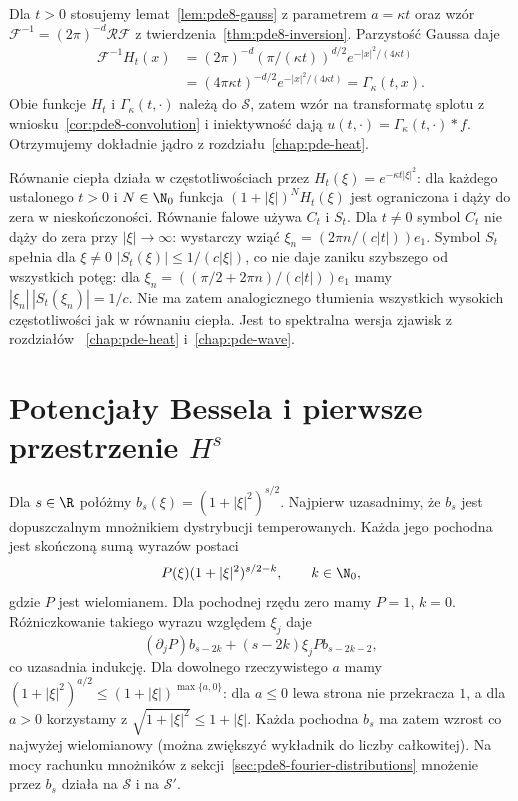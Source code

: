 \begin{uwaga}
Dla $t>0$ stosujemy lemat~\ref{lem:pde8-gauss}
z parametrem $a=\kappa t$ oraz wzór
$\mathcal F^{-1}=(2\pi)^{-d}\mathcal R\mathcal F$
z twierdzenia~\ref{thm:pde8-inversion}.
Parzystość Gaussa daje
\[
 \begin{aligned}
 \mathcal F^{-1}H_t(x)
 &=(2\pi)^{-d}(\pi/(\kappa t))^{d/2}
 e^{-|x|^2/(4\kappa t)}\\
 &=(4\pi\kappa t)^{-d/2}e^{-|x|^2/(4\kappa t)}
 =\Gamma_\kappa(t,x).
 \end{aligned}
\]
Obie funkcje $H_t$ i $\Gamma_\kappa(t,\cdot)$
należą do $\mathcal S$, zatem wzór na transformatę
splotu z wniosku~\ref{cor:pde8-convolution}
i iniektywność dają $u(t,\cdot)=
\Gamma_\kappa(t,\cdot)*f$. Otrzymujemy dokładnie
jądro z rozdziału~\ref{chap:pde-heat}.
\end{uwaga}

\begin{uwaga}
Równanie ciepła działa w częstotliwościach przez
$H_t(\xi)=e^{-\kappa t|\xi|^2}$: dla każdego
ustalonego $t>0$ i $N\in\N_0$ funkcja
$(1+|\xi|)^N H_t(\xi)$ jest ograniczona
i dąży do zera w nieskończoności.
Równanie falowe używa $C_t$ i $S_t$.
Dla $t\ne0$ symbol $C_t$ nie dąży do zera
przy $|\xi|\to\infty$: wystarczy wziąć
$\xi_n=(2\pi n/(c|t|))e_1$.
Symbol $S_t$ spełnia dla $\xi\ne0$
$|S_t(\xi)|\le1/(c|\xi|)$, co nie daje
zaniku szybszego od wszystkich potęg:
dla $\xi_n=((\pi/2+2\pi n)/(c|t|))e_1$
mamy $|\xi_n|\,|S_t(\xi_n)|=1/c$.
Nie ma zatem analogicznego tłumienia wszystkich
wysokich częstotliwości jak w równaniu ciepła.
Jest to spektralna wersja zjawisk z rozdziałów
~\ref{chap:pde-heat} i~\ref{chap:pde-wave}.
\end{uwaga}

\section[Potencjały Bessela i przestrzenie Sobolewa]{Potencjały Bessela i pierwsze przestrzenie $H^s$}
\label{sec:pde8-bessel}

Dla $s\in\R$ połóżmy $b_s(\xi)=(1+|\xi|^2)^{s/2}$.
Najpierw uzasadnimy, że $b_s$ jest dopuszczalnym
mnożnikiem dystrybucji temperowanych.
Każda jego pochodna jest skończoną sumą wyrazów
postaci
\[
 P(\xi)(1+|\xi|^2)^{s/2-k},
 \qquad k\in\N_0,
\]
gdzie $P$ jest wielomianem. Dla pochodnej rzędu
zero mamy $P=1$, $k=0$. Różniczkowanie takiego
wyrazu względem $\xi_j$ daje
\[
 (\partial_j P)b_{s-2k}
 +(s-2k)\xi_j P b_{s-2k-2},
\]
co uzasadnia indukcję.
Dla dowolnego rzeczywistego $a$ mamy
$(1+|\xi|^2)^{a/2}\le(1+|\xi|)^{\max\{a,0\}}$:
dla $a\le0$ lewa strona nie przekracza $1$,
a dla $a>0$ korzystamy z
$\sqrt{1+|\xi|^2}\le1+|\xi|$.
Każda pochodna $b_s$ ma zatem wzrost co najwyżej
wielomianowy (można zwiększyć wykładnik do
liczby całkowitej). Na mocy rachunku mnożników
z sekcji~\ref{sec:pde8-fourier-distributions}
mnożenie przez $b_s$ działa na $\mathcal S$
i na $\mathcal S'$.

